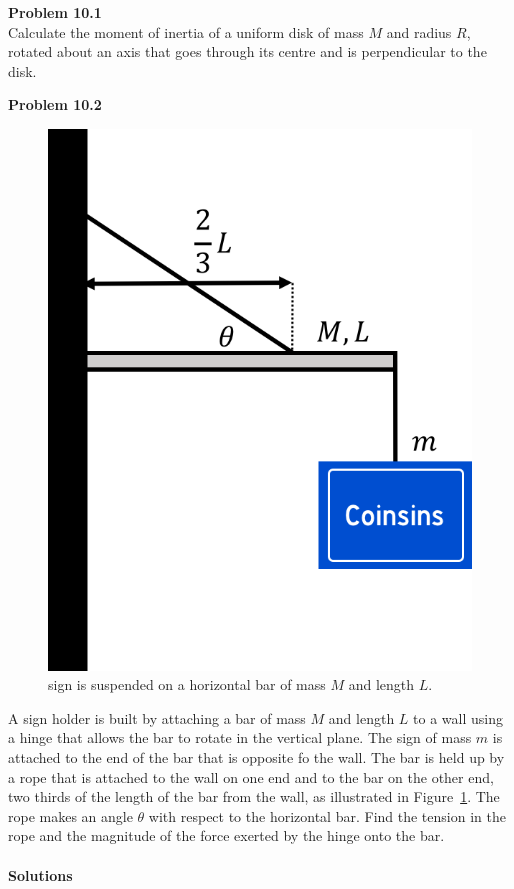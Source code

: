 \begin{framed}
\textbf{Problem 10.1}\\
Calculate the moment of inertia of a uniform disk of mass $M$ and radius $R$, rotated about an axis that goes through its centre and is perpendicular to the disk.
\end{framed}

\begin{framed}
\textbf{Problem 10.2}\\
\begin{figure}[!htbp]
\centering
\includegraphics[width=0.375\linewidth]{files/sign-93ec4d5e525231b8707d63b708054088.png}
\caption[]{sign is suspended on a horizontal bar of mass $M$ and length $L$.}
\label{fig:rotationaldynamics:sign}
\end{figure}

A sign holder is built by attaching a bar of mass $M$ and length $L$ to a wall using a hinge that allows the bar to rotate in the vertical plane. The sign of mass $m$ is attached to the end of the  bar that is opposite fo the wall. The bar is held up by a rope that is attached to the wall on one end and to the bar on the other end, two thirds of the length of the bar from the wall, as illustrated in Figure~\ref{fig:rotationaldynamics:sign}. The rope makes an angle $\theta$ with respect to the horizontal bar. Find the tension in the rope and the magnitude of the force exerted by the hinge onto the bar.
\end{framed}

\paragraph{Solutions}

